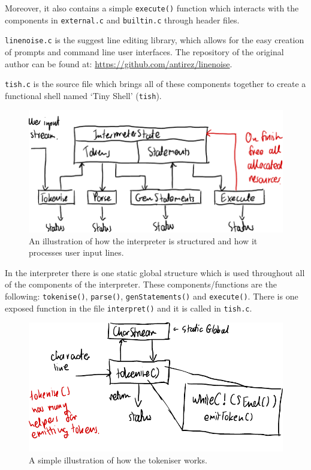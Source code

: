 \documentclass[12pt]{article}
\begin{document}
Moreover, it also contains a simple \texttt{execute()} function
which interacts with the components in \texttt{external.c} and
\texttt{builtin.c} through header files.

\texttt{linenoise.c} is the suggest line editing library, which
allows for the easy creation of prompts and command line user
interfaces. The repository of the original author can be found
at: \url{https://github.com/antirez/linenoise}.

\texttt{tish.c} is the source file which brings all of these
components together to create a functional shell named `Tiny
Shell' (\texttt{tish}).

\begin{figure}[H]
\centering
\includegraphics{interpreter-arch}
\caption{An illustration of how the interpreter is structured
and how it processes user input lines.}
\end{figure}



In the interpreter there is one static global structure which is
used throughout all of the components of the interpreter. These
components/functions are the following: \texttt{tokenise()},
\texttt{parse()}, \texttt{genStatements()} and
\texttt{execute()}. There is one exposed function in the file
\texttt{interpret()} and it is called in \texttt{tish.c}.

\begin{figure}[H]
\centering
\includegraphics{tokeniser}
\caption{A simple illustration of how the tokeniser works.}
\end{figure}
\end{document}
